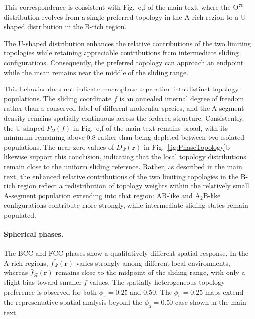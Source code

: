 \documentclass[journal=mamobx,manuscript=article]{achemso}
\begin{document}
	This correspondence is consistent with Fig.~e,f of the main text, where the O$^{70}$ distribution evolves from a single preferred topology in the A-rich region to a U-shaped distribution in the B-rich region.


	The U-shaped distribution enhances the relative contributions of the two limiting topologies while retaining appreciable contributions from intermediate sliding configurations.
	Consequently, the preferred topology can approach an endpoint while the mean remains near the middle of the sliding range.
	
	This behavior does not indicate macrophase separation into distinct topology populations.
	The sliding coordinate $f$ is an annealed internal degree of freedom rather than a conserved label of different molecular species, and the A-segment density remains spatially continuous across the ordered structure.
	Consistently, the U-shaped $P_\Omega(f)$ in Fig.~e,f of the main text remains broad, with its minimum remaining above $0.8$ rather than being depleted between two isolated populations. 
	The near-zero values of $D_{\mathcal R}(\bm r)$ in Fig.~\ref{fig:PhaseTopology}b likewise support this conclusion, indicating that the local topology distributions remain close to the uniform sliding reference.
	Rather, as described in the main text, the enhanced relative contributions of the two limiting topologies in the B-rich region reflect a redistribution of topology weights within the relatively small A-segment population extending into that region: AB-like and A$_2$B-like configurations contribute more strongly, while intermediate sliding states remain populated.
	


	\paragraph{Spherical phases.}

	The BCC and FCC phases show a qualitatively different spatial response.
	In the A-rich regions, $f_{\mathcal R}^\ast(\bm r)$ varies strongly among different local environments, whereas $\bar f_{\mathcal R}(\bm r)$ remains close to the midpoint of the sliding range, with only a slight bias toward smaller $f$ values.
	The spatially heterogeneous topology preference is observed for both $\phi_{\mathrm a}=0.25$ and $0.50$.
	The $\phi_{\mathrm a}=0.25$ maps extend the representative spatial analysis beyond the $\phi_{\mathrm a}=0.50$ case shown in the main text.
\end{document}
